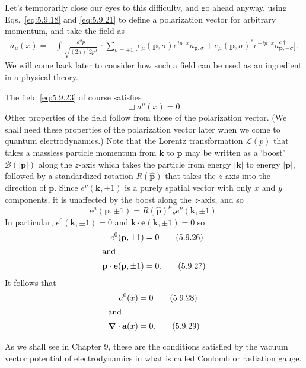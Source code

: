 Let's temporarily close our eyes to this difficulty, and go ahead anyway,
using Eqs.~\eqref{eq:5.9.18} and \eqref{eq:5.9.21} to define a polarization vector for arbitrary
momentum, and take the field as
\begin{align}
a_\mu(x)={}&\int \frac{d^3 p}{\sqrt{(2\pi)^3 2p^0}} \,
\cdot\sum_{\sigma=\pm1}\bigl[e_\mu(\mathbf p,\sigma)e^{ip\cdot x}
a_{\mathbf p,\sigma}+e_\mu(\mathbf p,\sigma)^*e^{-ip\cdot x}
a^{c\dagger}_{\mathbf p,-\sigma}\bigr].
\tag{5.9.23}\label{eq:5.9.23}
\end{align}
We will come back later to consider how such a field can be used as an
ingredient in a physical theory.

The field \eqref{eq:5.9.23} of course satisfies
\begin{equation}
\Box a^\mu(x)=0.
\tag{5.9.24}\label{eq:5.9.24}
\end{equation}
Other properties of the field follow from those of the polarization vector.
(We shall need these properties of the polarization vector later when we come
to quantum electrodynamics.) Note that the Lorentz transformation $\mathcal
L(p)$ that takes a massless particle momentum from $\mathbf k$ to $\mathbf p$
may be written as a `boost' $\mathcal B(|\mathbf p|)$ along the $z$-axis which
takes the particle from energy $|\mathbf k|$ to energy $|\mathbf p|$, followed
by a standardized rotation $R(\widehat{\mathbf p})$ that takes the $z$-axis
into the direction of $\mathbf p$. Since $e^\nu(\mathbf k,\pm1)$ is a purely
spatial vector with only $x$ and $y$ components, it is unaffected by the boost
along the $z$-axis, and so
\begin{equation}
e^\mu(\mathbf p,\pm1)=R(\widehat{\mathbf p})^\mu{}_\nu
e^\nu(\mathbf k,\pm1).
\tag{5.9.25}\label{eq:5.9.25}
\end{equation}
In particular, $e^0(\mathbf k,\pm1)=0$ and
$\mathbf k\cdot\mathbf e(\mathbf k,\pm1)=0$ so
\begin{align}
e^0(\mathbf p,\pm1)&=0
\tag{5.9.26}\label{eq:5.9.26}\\
\intertext{and}
\mathbf p\cdot\mathbf e(\mathbf p,\pm1)&=0.
\tag{5.9.27}\label{eq:5.9.27}
\end{align}
It follows that
\begin{align}
a^0(x)&=0
\tag{5.9.28}\label{eq:5.9.28}\\
\intertext{and}
\boldsymbol\nabla\cdot\mathbf a(x)&=0.
\tag{5.9.29}\label{eq:5.9.29}
\end{align}

As we shall see in Chapter 9, these are the conditions satisfied by the vacuum
vector potential of electrodynamics in what is called Coulomb or radiation
gauge.

